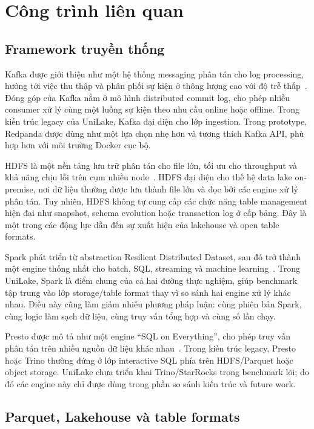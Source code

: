 \section{Công trình liên quan}

\subsection{Framework truyền thống}

Kafka được giới thiệu như một hệ thống messaging phân tán cho log processing, hướng tới việc thu thập và phân phối sự kiện ở thông lượng cao với độ trễ thấp~\cite{kafkaPaper}. Đóng góp của Kafka nằm ở mô hình distributed commit log, cho phép nhiều consumer xử lý cùng một luồng sự kiện theo nhu cầu online hoặc offline. Trong kiến trúc legacy của UniLake, Kafka đại diện cho lớp ingestion. Trong prototype, Redpanda được dùng như một lựa chọn nhẹ hơn và tương thích Kafka API, phù hợp hơn với môi trường Docker cục bộ.

HDFS là một nền tảng lưu trữ phân tán cho file lớn, tối ưu cho throughput và khả năng chịu lỗi trên cụm nhiều node~\cite{hdfsPaper}. HDFS đại diện cho thế hệ data lake on-premise, nơi dữ liệu thường được lưu thành file lớn và đọc bởi các engine xử lý phân tán. Tuy nhiên, HDFS không tự cung cấp các chức năng table management hiện đại như snapshot, schema evolution hoặc transaction log ở cấp bảng. Đây là một trong các động lực dẫn đến sự xuất hiện của lakehouse và open table formats.

Spark phát triển từ abstraction Resilient Distributed Dataset, sau đó trở thành một engine thống nhất cho batch, SQL, streaming và machine learning~\cite{rddPaper,sparkCacm}. Trong UniLake, Spark là điểm chung của cả hai đường thực nghiệm, giúp benchmark tập trung vào lớp storage/table format thay vì so sánh hai engine xử lý khác nhau. Điều này cũng làm giảm nhiễu phương pháp luận: cùng phiên bản Spark, cùng logic làm sạch dữ liệu, cùng truy vấn tổng hợp và cùng số lần chạy.

Presto được mô tả như một engine ``SQL on Everything'', cho phép truy vấn phân tán trên nhiều nguồn dữ liệu khác nhau~\cite{prestoPaper}. Trong kiến trúc legacy, Presto hoặc Trino thường đứng ở lớp interactive SQL phía trên HDFS/Parquet hoặc object storage. UniLake chưa triển khai Trino/StarRocks trong benchmark lõi; do đó các engine này chỉ được dùng trong phần so sánh kiến trúc và future work.

\subsection{Parquet, Lakehouse và table formats}

